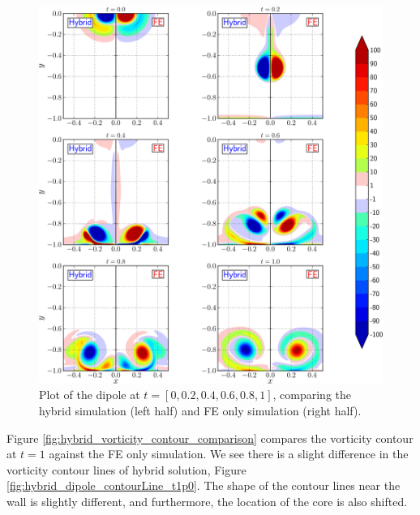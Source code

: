 	\begin{figure}[!b]
	\centering
	\includegraphics[width=\linewidth]{./figures/validation/cbColl/hybrid_doubleMonolope_contourfComparisonNew_compressed-crop.png}
	\caption{Plot of the dipole at $t = [0, 0.2, 0.4, 0.6, 0.8, 1]$, comparing the hybrid simulation (left half) and FE only simulation (right half).}
	\label{fig:hybrid_doubleMonolope_contourfComparison}
	\end{figure}




Figure \ref{fig:hybrid_vorticity_contour_comparison} compares the vorticity contour at $t=1$ against the FE only simulation. We see there is a slight difference in the vorticity contour lines of hybrid solution, Figure \ref{fig:hybrid_dipole_contourLine_t1p0}. The shape of the contour lines near the wall is slightly different, and furthermore, the location of the core is also shifted.


